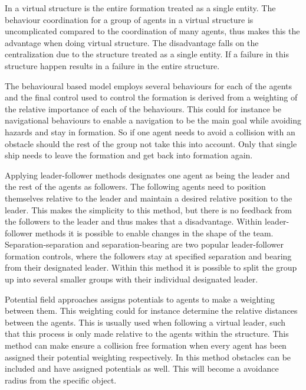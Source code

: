 \begin{description}[style=nextline]
	\item [Virtual structure]
	In a virtual structure is the entire formation treated as a single entity. The behaviour coordination for a group of agents in a virtual structure is uncomplicated compared to the coordination of many agents, thus makes this the advantage when doing virtual structure. The disadvantage falls on the centralization due to the structure treated as a single entity. If a failure in this structure happen results in a failure in the entire structure.
	\item [Behaviour Based Methods]
	The behavioural based model employs several behaviours for each of the agents and the final control used to control the formation is derived from a weighting of the relative importance of each of the behaviours. This could for instance be navigational behaviours to enable a navigation to be the main goal while avoiding hazards and stay in formation. So if one agent needs to avoid a collision with an obstacle should the rest of the group not take this into account. Only that single ship needs to leave the formation and get back into formation again.
	\item [Leader-Follower Approaches]
	Applying leader-follower methods designates one agent as being the leader and the rest of the agents as followers. The following agents need to position themselves relative to the leader and maintain a desired relative position to the leader. This makes the simplicity to this method, but there is no feedback from the followers to the leader and thus makes that a disadvantage. Within leader-follower methods it is possible to enable changes in the shape of the team. Separation-separation and separation-bearing are two popular leader-follower formation controls, where the followers stay at specified separation and bearing from their designated leader. Within this method it is possible to split the group up into several smaller groups with their individual designated leader.
	\item [Potential Field Approach]
	Potential field approaches assigns potentials to agents to make a weighting between them. This weighting could for instance determine the relative distances between the agents. This is usually used when following a virtual leader, such that this process is only made relative to the agents within the structure. This method can make ensure a collision free formation when every agent has been assigned their potential weighting respectively. In this method obstacles can be included and have assigned potentials as well. This will become a avoidance radius from the specific object.

\end{description}
